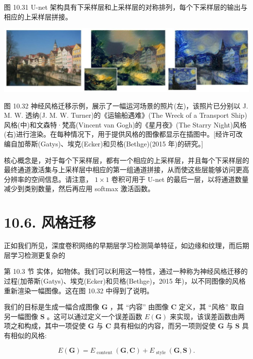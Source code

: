 \documentclass[10pt]{article}
\begin{document}
图 10.31 U-net 架构具有下采样层和上采样层的对称排列，每个下采样层的输出与相应的上采样层拼接。

\begin{center}
\includegraphics[max width=1.0\textwidth]{images/0194e279-9b28-703a-88f4-c3ac21e2010d_339_245_349_1304_340_0.jpg}
\end{center}
\hspace*{3em} 

图 10.32 神经风格迁移示例，展示了一幅运河场景的照片(左)，该照片已分别以 J. M. W. 透纳(J. M. W. Turner)的《运输船遇难》(The Wreck of a Transport Ship)风格(中)和文森特·梵高(Vincent van Gogh)的《星月夜》(The Starry Night)风格(右)进行渲染。在每种情况下，用于提供风格的图像都显示在插图中。[经许可改编自加蒂斯(Gatys)、埃克(Ecker)和贝格(Bethge)(2015 年)的研究。]

核心概念是，对于每个下采样层，都有一个相应的上采样层，并且每个下采样层的最终通道激活集与上采样层中相应的第一组通道拼接，从而使这些层能够访问更高分辨率的空间信息。请注意， \(1 \times  1\) 卷积可用于 U-net 的最后一层，以将通道数量减少到类别数量，然后再应用 softmax 激活函数。

\section*{10.6. 风格迁移}

正如我们所见，深度卷积网络的早期层学习检测简单特征，如边缘和纹理，而后期层学习检测更复杂的

第 10.3 节 实体，如物体。我们可以利用这一特性，通过一种称为神经风格迁移的过程(加蒂斯(Gatys)、埃克(Ecker)和贝格(Bethge)，2015 年)，以不同图像的风格重新渲染一幅图像。这在图 10.32 中得到了说明。

我们的目标是生成一幅合成图像 \(\mathbf{G}\) ，其 “内容” 由图像 \(\mathbf{C}\) 定义，其 “风格” 取自另一幅图像 \(\mathbf{S}\) 。这可以通过定义一个误差函数 \(E\left( \mathbf{G}\right)\) 来实现，该误差函数由两项之和构成，其中一项促使 \(\mathbf{G}\) 与 \(\mathbf{C}\) 具有相似的内容，而另一项则促使 \(\mathbf{G}\) 与 \(\mathbf{S}\) 具有相似的风格:

\[
E\left( \mathbf{G}\right)  = {E}_{\text{ content }}\left( {\mathbf{G},\mathbf{C}}\right)  + {E}_{\text{ style }}\left( {\mathbf{G},\mathbf{S}}\right) . \tag{10.13}
\]
\end{document}
